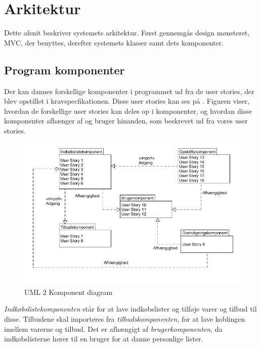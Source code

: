 \section{Arkitektur}
Dette afsnit beskriver systemets arkitektur.
Først gennemgås design mønsteret, MVC, der benyttes, derefter systemets klasser samt dets komponenter.



\subsection{Program komponenter}\label{subsec:komp}
Der kan dannes forskellige komponenter i programmet ud fra de user stories, der blev opstillet i kravspecfikationen.
Disse user stories kan ses på .
Figuren viser, hvordan de forskellige user stories kan deles op i komponenter, og hvordan disse komponenter afhænger af og bruger hinanden, som beskrevet ud fra vores user stories.

\begin{figure}
	\vspace{-20pt}
	\begin{center}
		\includegraphics[scale=0.6]{images/Diagrams/Komponenter.png}
	\end{center}
	\vspace{-20pt}
	\caption{UML 2 Komponent diagram }\label{figure:komp}
	\vspace{-20pt}
\end{figure}

\textit{Indkøbslistekomponenten} står for at lave indkøbslister og tilføje varer og tilbud til disse.
Tilbudene skal importeres fra \textit{tilbudskomponenten}, for at lave koblingen imellem varerne og tilbud.
Det er afhængigt af \textit{brugerkomponenten}, da indkøbslisterne hører til en bruger for at danne personlige lister. 

